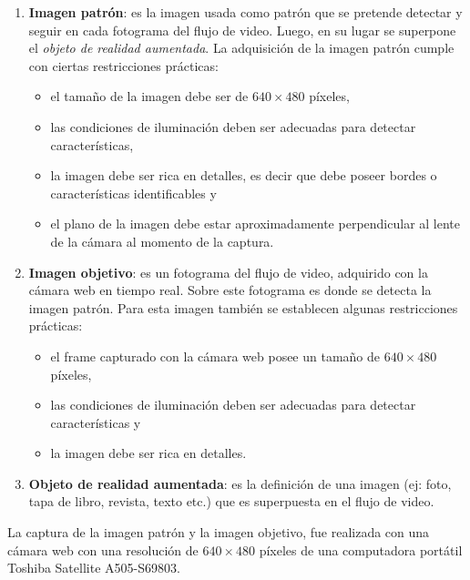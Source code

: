 \begin{enumerate}
  \item \textbf{Imagen patrón}: es la imagen usada como patrón que se pretende detectar y seguir en cada fotograma del flujo de video. Luego, en su lugar se superpone el \textit{objeto de realidad aumentada}.
\label{imagenpatron_restricciones}
  La adquisición de la imagen patrón cumple con ciertas restricciones prácticas:
  \begin{itemize}
   \item el tamaño de la imagen debe ser de $640 \times 480$ píxeles,
   \item las condiciones de iluminación deben ser adecuadas para detectar características,%
   \item la imagen debe ser rica en detalles, es decir que debe poseer bordes o características identificables y
   \item el plano de la imagen debe estar aproximadamente perpendicular al lente de la cámara al momento de la captura.
  \end{itemize}
  \item \textbf{Imagen objetivo}: es un fotograma del flujo de video, adquirido con la cámara web en tiempo real. Sobre este fotograma es donde se detecta la imagen patrón. Para esta imagen también se establecen algunas restricciones prácticas:
  \begin{itemize}
   \item el frame capturado con la cámara web posee un tamaño de $640 \times 480$ píxeles,
   \item las condiciones de iluminación deben ser adecuadas para detectar características y
   \item la imagen debe ser rica en detalles.
  \end{itemize}
  \item \textbf{Objeto de realidad aumentada}: es la definición de una imagen (ej: foto, tapa de libro, revista, texto etc.) que es superpuesta en el flujo de video.
\end{enumerate}

  La captura de la imagen patrón y la imagen objetivo, fue realizada con una cámara web con una resolución de $640 \times 480$ píxeles de una computadora portátil Toshiba Satellite A505-S69803.
  
